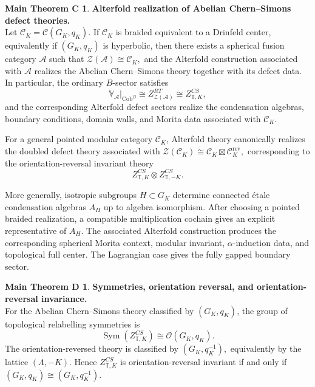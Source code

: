 \documentclass[12pt]{amsart}
\numberwithin{equation}{section}
\theoremstyle{definition}
\newtheorem*{theoremC}{Main Theorem C}
\newtheorem*{theoremD}{Main Theorem D}
\begin{document}
\newpage
\begin{theoremC}\textbf{Alterfold realization of Abelian Chern--Simons defect theories.}
\leavevmode\\

Let $\mathcal C_K=\mathcal C(G_K,q_K)$. If $\mathcal C_K$ is braided equivalent to a Drinfeld center, equivalently if
$(G_K,q_K)$ is hyperbolic, then there exists a spherical fusion category
$\mathcal A$ such that
$
\mathcal Z(\mathcal A)\cong\mathcal C_K,
$
and the Alterfold construction associated with $\mathcal A$ realizes the
Abelian Chern--Simons theory together with its defect data. In particular,
the ordinary $B$-sector satisfies
$$
\mathbb V_{\mathcal A}|_{\mathrm{Cob}^{B}}
\cong
Z^{RT}_{\mathcal Z(\mathcal A)}
\cong
Z^{CS}_{\mathbb T,K},
$$
and the corresponding Alterfold defect sectors realize the condensation
algebras, boundary conditions, domain walls, and Morita data associated with
$\mathcal C_K$.

For a general pointed modular category $\mathcal C_K$, Alterfold theory
canonically realizes the doubled defect theory associated with
$
\mathcal Z(\mathcal C_K)
\cong
\mathcal C_K\boxtimes\mathcal C_K^{\mathrm{rev}},
$ corresponding to the orientation-reversal invariant theory
$$
Z^{CS}_{\mathbb T,K}\otimes Z^{CS}_{\mathbb T,-K}.
$$

More generally, isotropic subgroups
$
H\subset G_K
$ determine connected étale condensation algebras $A_H$ up to algebra
isomorphism. After choosing a pointed braided realization, a compatible
multiplication cochain gives an explicit representative of $A_H$. The
associated Alterfold construction produces the corresponding spherical
Morita context, modular invariant, $\alpha$-induction data, and topological
full center. The Lagrangian case gives the fully gapped boundary sector.
\end{theoremC}


\begin{theoremD}\textbf{Symmetries, orientation reversal, and orientation-reversal invariance.}
\leavevmode\\
For the Abelian Chern--Simons theory classified by $(G_K,q_K)$, the group of
topological relabelling symmetries is
$$
\operatorname{Sym}(Z^{CS}_{\mathbb T,K})
\cong
\mathcal O(G_K,q_K)  .
$$
The orientation-reversed theory is classified by $(G_K,q_K^{-1}),$ equivalently by the lattice $(\Lambda,-K)$. Hence $Z^{CS}_{\mathbb T,K}$ is orientation-reversal invariant if and only if $ (G_K,q_K)\cong (G_K,q_K^{-1}). $
\end{theoremD}
\end{document}
